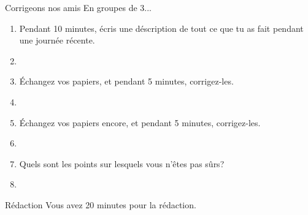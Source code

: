 \documentclass{beamer}
\begin{document}
  \begin{frame}{Corrigeons nos amis}
    En groupes de 3...
    \begin{enumerate}
      \item Pendant 10 minutes, écris une déscription de tout ce que tu as fait pendant une journée récente.
      \item[] 
      \item<2-> Échangez vos papiers, et pendant 5 minutes, corrigez-les.
      \item<2->[] 
      \item<3-> Échangez vos papiers encore, et pendant 5 minutes, corrigez-les.
      \item<3->[] 
      \item<4-> Quels sont les points sur lesquels vous n'êtes pas sûrs?
      \item<4->[] 
    \end{enumerate}
  \end{frame}

  \begin{frame}{Rédaction}
    Vous avez 20 minutes pour la rédaction.
  \end{frame}
\end{document}
